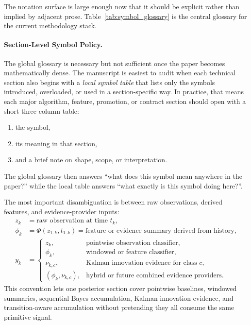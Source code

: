\documentclass[11pt]{article}
\begin{document}
\noindent
The notation surface is large enough now that it should be explicit rather than implied by adjacent prose. Table~\ref{tab:symbol_glossary} is the central glossary for the current methodology stack.
\begin{table}[htbp]
\centering
\caption{Core symbols used across the current methodology layer.}
\label{tab:symbol_glossary}

\end{table}

\paragraph{Section-Level Symbol Policy.}
The global glossary is necessary but not sufficient once the paper becomes
mathematically dense. The manuscript is easiest to audit when each technical
section also begins with a \emph{local symbol table} that lists only the
symbols introduced, overloaded, or used in a section-specific way. In practice,
that means each major algorithm, feature, promotion, or contract section should
open with a short three-column table:
\begin{enumerate}[leftmargin=1.5em]
  \item the symbol,
  \item its meaning in that section,
  \item and a brief note on shape, scope, or interpretation.
\end{enumerate}
The global glossary then answers ``what does this symbol mean anywhere in the
paper?'' while the local table answers ``what exactly is this symbol doing
here?''.

The most important disambiguation is between raw observations, derived features, and evidence-provider inputs:
\begin{align}
z_k &= \text{raw observation at time } t_k, \\
\phi_k &= \Phi(z_{1:k}, t_{1:k}) = \text{feature or evidence summary derived from history}, \\
y_k &=
\begin{cases}
z_k, & \text{pointwise observation classifier}, \\
\phi_k, & \text{windowed or feature classifier}, \\
\nu_{k,c}, & \text{Kalman innovation evidence for class } c, \\
(\phi_k, \nu_{k,c}), & \text{hybrid or future combined evidence providers}.
\end{cases}
\end{align}
This convention lets one posterior section cover pointwise baselines, windowed summaries, sequential Bayes accumulation, Kalman innovation evidence, and transition-aware accumulation without pretending they all consume the same primitive signal.
\end{document}

